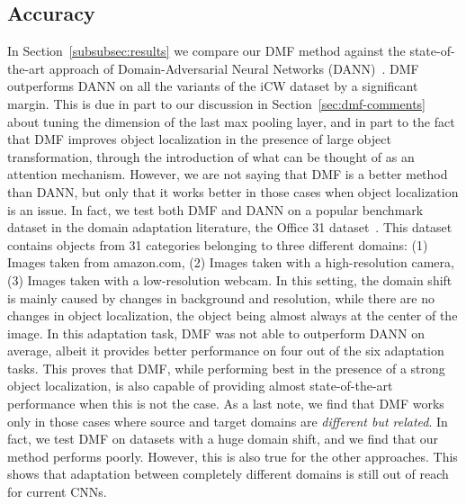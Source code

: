 \documentclass[../main.tex]{subfiles}
\begin{document}
    \subsection{Accuracy}
    In Section~\ref{subsubsec:results} we compare our DMF method against the state-of-the-art approach of Domain-Adversarial
    Neural Networks (DANN)~\cite{DANN}. DMF outperforms DANN on all the variants of the iCW dataset by a significant margin.
    This is due in part to our discussion in Section~\ref{sec:dmf-comments} about tuning the dimension of the last max pooling
    layer, and in part to the fact that DMF improves object localization in the presence of large object transformation, through
    the introduction of what can be thought of as an attention mechanism. However, we are not saying that DMF is a better method
    than DANN, but only that it works better in those cases when object localization is an issue. In fact, we test both DMF and
    DANN on a popular benchmark dataset in the domain adaptation literature, the Office 31 dataset~\cite{office}. This dataset
	contains objects from 31 categories belonging to three different domains: (1) Images taken from amazon.com, (2) Images
	taken with a high-resolution camera, (3) Images taken with a low-resolution webcam. In this setting, the domain shift is
	mainly caused by changes in background and resolution, while there are no changes in object localization, the object being
	almost always at the center of the image. In this adaptation task, DMF was not able to outperform DANN on average, albeit
	it provides better performance on four out of the six adaptation tasks. This proves that DMF, while performing best in the
	presence of a strong object localization, is also capable of providing almost state-of-the-art performance when this is
	not the case. As a last note, we find that DMF works only in those cases where source and target domains are
	\textit{different but related}. In fact, we test DMF on datasets with a huge domain shift, and we find that our method
	performs poorly. However, this is also true for the other approaches. This shows that adaptation between completely
	different domains is still out of reach for current CNNs.
    
\end{document}
